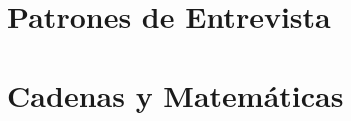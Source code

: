 \documentclass[12pt, a4paper, openany]{book}
\begin{document}
\part{~Patrones de Entrevista}













\part{~Cadenas y Matemáticas}


\end{document}
